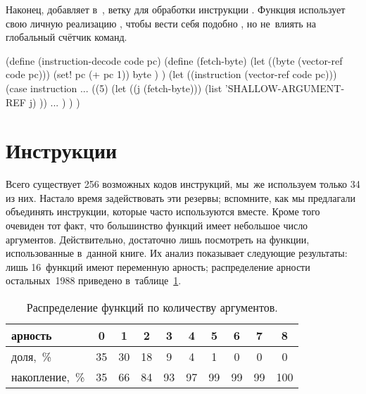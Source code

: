 Наконец,  добавляет в~,
ветку для обработки инструкции . Функция
 использует свою личную реализацию ,
чтобы вести себя подобно , но не~влиять на глобальный счётчик команд.

\begin{code:lisp}
(define (instruction-decode code pc)
  (define (fetch-byte)
    (let ((byte (vector-ref code pc)))
      (set! pc (+ pc 1))
      byte ) )
  (let ((instruction (vector-ref code pc)))
    (case instruction
      ...
      ((5) (let ((j (fetch-byte)))
             (list 'SHALLOW-ARGUMENT-REF j) ))
      ... ) ) )
\end{code:lisp}


\section{Инструкции}\label{compilation/sect:instructions}

Всего существует 256 возможных кодов инструкций, мы~же используем только 34 из
них. Настало время задействовать эти резервы; вспомните, как мы предлагали
объединять инструкции, которые часто используются вместе. Кроме того очевиден
\cite{cha80} тот факт, что большинство функций имеет небольшое число аргументов.
Действительно, достаточно лишь посмотреть на функции, использованные в~данной
книге. Их анализ показывает следующие результаты: лишь 16~функций имеют
переменную арность; распределение арности остальных~1988 приведено
в~таблице~\ref{compilation/instructions/table:probs}.

\begin{table}[!ht]\renewcommand*{\arraystretch}{1.15}
\begin{center}\begin{tabular}{lccccccccc}
\hline%
арность        &  0 &  1 &  2 &  3 &  4 &  5 &  6 &  7 &   8 \\
\hline%
доля,~\%       & 35 & 30 & 18 &  9 &  4 &  1 &  0 &  0 &   0 \\
накопление,~\% & 35 & 66 & 84 & 93 & 97 & 99 & 99 & 99 & 100
\end{tabular}\end{center}%
\caption{Распределение функций по количеству аргументов.}%
\label{compilation/instructions/table:probs}%
\end{table}

